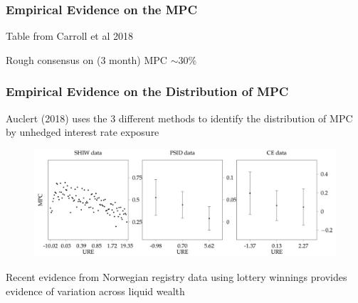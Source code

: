 \documentclass{beamer}
\begin{document}
{
	\frametitle{Empirical Evidence on the MPC}
	\begin{center}
	\tiny{Table from Carroll et al 2018}
\end{center}
Rough consensus on (3 month) MPC $\sim 30\%$
}
\frame
{
	\frametitle{Empirical Evidence on the Distribution of MPC}
	Auclert (2018) uses the 3 different methods to identify the distribution of MPC by unhedged interest rate exposure
	\begin{figure}
		\includegraphics[scale=0.6]{../Figures/MPCDistributionAuclert}
	\end{figure}
	Recent evidence from Norwegian registry data using lottery winnings provides evidence of variation across liquid wealth
}
\end{document}
